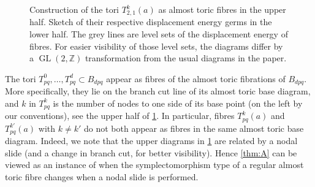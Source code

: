 \documentclass[12pt,a4paper,abstract=true,draft]{scrartcl}
\DeclareMathOperator{\GL}{GL}
\begin{document}
\begin{figure}
    \centering
    \caption{Construction of the tori $T^k_{2,1}(a)$ as almost toric fibres in the upper half.
Sketch of their respective displacement energy germs in the lower half.
The grey lines are level sets of the displacement energy of fibres.
For easier visibility of those level sets, the diagrams differ by a $\GL(2,ℤ)$ transformation from the usual diagrams in the paper.}
    \label{fig:germ_examples}
\end{figure}

The tori $T^0_{pq}, \ldots , T^d_{pq} \subset B_{dpq}$ appear as fibres of the almost toric fibrations of $B_{dpq}$.
More specifically, they lie on the branch cut line of its almost toric base diagram, and $k$ in $T^k_{pq}$ is the number of nodes to one side of its base point (on the left by our conventions), see the upper half of \cref{fig:germ_examples}.
In particular, fibres $T^k_{pq}(a)$ and $T^{k'}_{pq}(a)$ with $k \neq k'$ do not both appear as fibres in the same almost toric base diagram.
Indeed, we note that the upper diagrams in \cref{fig:germ_examples} are related by a nodal slide (and a change in branch cut, for better visibility).
Hence \cref{thm:A} can be viewed as an instance of when the symplectomorphism type of a regular almost toric fibre changes when a nodal slide is performed. 
\end{document}
